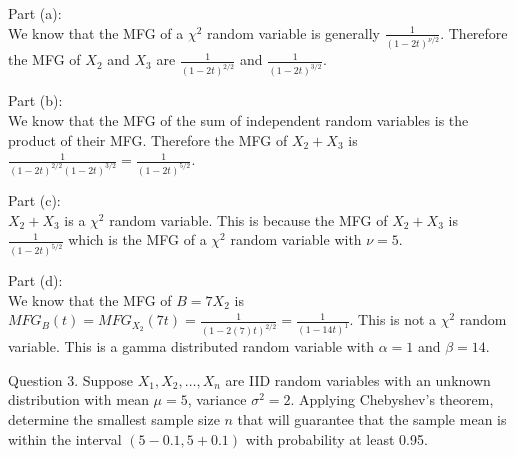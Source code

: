 \documentclass[answers,12pt,addpoints]{exam}
\begin{document}
\begin{questions}
    \begin{solution}
        Part (a):\\
        We know that the MFG of a $\chi^2$ random variable is generally $\frac{1}{(1-2t)^{\nu/2}}$. Therefore the MFG of $X_2$ and $X_3$ are $\frac{1}{(1-2t)^{2/2}}$ and $\frac{1}{(1-2t)^{3/2}}$.\\
    \end{solution}
    \begin{solution}
        Part (b):\\
        We know that the MFG of the sum of independent random variables is the product of their MFG. Therefore the MFG of $X_2 + X_3$ is $\frac{1}{(1-2t)^{2/2}(1-2t)^{3/2}} = \frac{1}{(1-2t)^{5/2}}$.\\
    \end{solution}
    \begin{solution}
        Part (c):\\
        $X_2 + X_3$ is  a $\chi^2$ random variable. This is because the MFG of $X_2 + X_3$ is $\frac{1}{(1-2t)^{5/2}}$ which is the MFG of a $\chi^2$ random variable with $\nu = 5$.\\
    \end{solution}
    \begin{solution}
        Part (d):\\
        We know that the MFG of $B = 7X_2$ is $MFG_{B}(t) = MFG_{X_2}(7t) = \frac{1}{(1-2(7)t)^{2/2}} = \frac{1}{(1-14t)^{1}}$. This is not a $\chi^2$ random variable. This is a gamma distributed random variable with $\alpha = 1$ and $\beta = 14$.\\
    \end{solution}
    \question Question 3.
    Suppose $X_1, X_2, \ldots, X_n$ are IID random variables with an unknown distribution with mean $\mu = 5$, variance $\sigma^2 = 2$. Applying Chebyshev's theorem, determine the smallest sample size $n$ that will guarantee that the sample mean is within the interval $(5 - 0.1, 5 + 0.1)$ with probability at least 0.95.

\end{questions}
\end{document}
